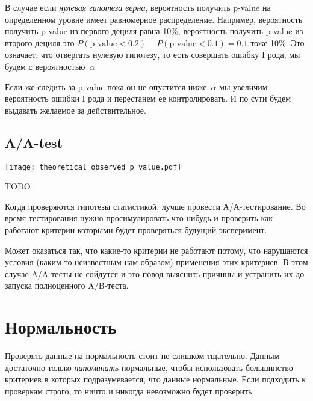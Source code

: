 \documentclass[../handbook.tex]{subfiles}
\begin{document}
В случае если \emph{нулевая гипотеза верна}, вероятность получить p-value на
определенном уровне имеет равномерное распределение. Например, вероятность
получить p-value из первого дециля равна 10\%, вероятность получить p-value из
второго дециля это $P(\text{p-value} < 0.2) - P(\text{p-value} < 0.1) = 0.1$
тоже 10\%. Это означает, что отвергать нулевую гипотезу, то есть совершать ошибку I рода, мы будем с вероятностью~$\alpha$. 

Если же следить за p-value пока он не опустится ниже~$\alpha$ мы увеличим вероятность ошибки I рода и перестанем ее контролировать. И по сути будем выдавать желаемое за действительное.

\subsection{A/A-test}

\begin{marginfigure}
    \texttt{[image: theoretical\_observed\_p\_value.pdf]}
    \caption{TODO}
\end{marginfigure}

Когда проверяются гипотезы статистикой, лучше провести
А/А-тес\-ти\-ро\-ва\-ние. Во время тестирования нужно просимулировать
что-нибудь и проверить как работают критерии которыми будет проверяться будущий
эксперимент.

Может оказаться так, что какие-то критерии не работают потому, что нарушаются
условия (каким-то неизвестным нам образом) применения этих критериев. В этом
случае A/A-тесты не сойдутся и это повод выяснить причины и устранить их до
запуска полноценного A/B-теста.

\section{Нормальность}
Проверять данные на нормальность стоит не слишком тщательно. Данным достаточно только \emph{напоминать} нормальные, чтобы использовать большинство критериев в которых подразумевается, что данные нормальные. Если подходить к проверкам строго, то ничто и никогда невозможно будет проверить. 
\end{document}
